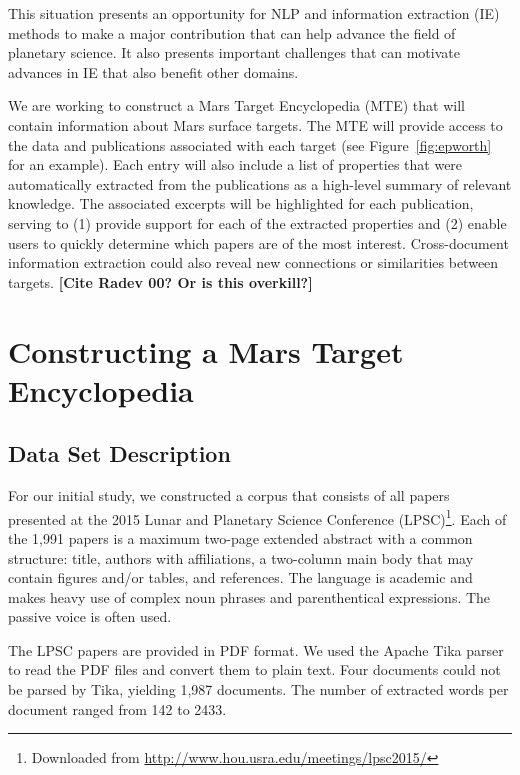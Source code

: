 \documentclass[letterpaper]{article}
\begin{document}

This situation presents an opportunity for NLP and information
extraction (IE) methods to make a major contribution that can help
advance the field of planetary science.  It also presents important
challenges that can motivate advances in IE that also benefit other
domains. 

We are working to construct a Mars Target Encyclopedia (MTE) that will
contain information about Mars surface targets.  The MTE will provide
access to the data and publications associated with each target (see
Figure~\ref{fig:epworth} for an example).  Each entry will also
include a list of properties that were automatically extracted from
the publications as a high-level summary of relevant knowledge.  The
associated excerpts will be highlighted for each publication, serving
to (1) provide support for each of the extracted properties and (2)
enable users to quickly determine which papers are of the most
interest.  Cross-document information extraction could also reveal new
connections or similarities between targets. {\bf [Cite Radev 00? Or
is this overkill?]}

\section{Constructing a Mars Target Encyclopedia}

\subsection{Data Set Description}

For our initial study, we constructed a corpus that consists of all
papers presented at the 2015 Lunar and Planetary Science
Conference (LPSC)\footnote{Downloaded
from \url{http://www.hou.usra.edu/meetings/lpsc2015/}}. 
Each of the 1,991 papers is a maximum two-page extended abstract with a
common structure: title, authors with affiliations, a two-column main
body that may contain figures and/or tables, and references.  The
language is academic and makes heavy use of complex noun phrases and
parenthentical expressions.  The passive voice is often used.

The LPSC papers are provided in PDF format.  We used the Apache Tika
parser~\cite{mattmann:tika11} to read the PDF files and convert them to
plain text.  Four documents could not be parsed by Tika, yielding
1,987 documents.  The number of extracted words per document ranged
from 142 to 2433.
\end{document}
